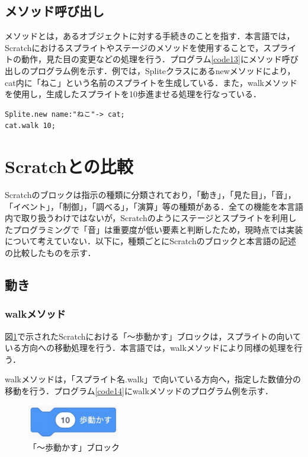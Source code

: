 \documentclass[10pt,a4j]{ltjsarticle}
\begin{document}
\subsection{メソッド呼び出し}
メソッドとは，あるオブジェクトに対する手続きのことを指す．本言語では，Scratchにおけるスプライトやステージのメソッドを使用することで，スプライトの動作，見た目の変更などの処理を行う．プログラム\ref{code13}にメソッド呼び出しのプログラム例を示す．例では，Spliteクラスにあるnewメソッドにより，cat内に「ねこ」という名前のスプライトを生成している．また，walkメソッドを使用し，生成したスプライトを10歩進ませる処理を行なっている．

\begin{lstlisting}[caption=メソッド呼び出しのプログラム例, label=code13]
Splite.new name:"ねこ"-> cat;
cat.walk 10; 
\end{lstlisting}
\clearpage

\section{Scratchとの比較}
Scratchのブロックは指示の種類に分類されており，「動き」，「見た目」，「音」，「イベント」，「制御」，「調べる」，「演算」等の種類がある．全ての機能を本言語内で取り扱うわけではないが，Scratchのようにステージとスプライトを利用したプログラミングで「音」は重要度が低い要素と判断したため，現時点では実装について考えていない．以下に，種類ごとにScratchのブロックと本言語の記述の比較したものを示す．
\subsection{動き}
\subsubsection{walkメソッド}
図\ref{fig:walk}で示されたScratchにおける「〜歩動かす」ブロックは，スプライトの向いている方向への移動処理を行う．本言語では，walkメソッドにより同様の処理を行う．

walkメソッドは，「スプライト名.walk」で向いている方向へ，指定した数値分の移動を行う．プログラム\ref{code14}にwalkメソッドのプログラム例を示す．

\begin{figure}[H]
  \centering
  \includegraphics[height=15mm]{images/walk.pdf}
  \caption{「〜歩動かす」ブロック}
  \label{fig:walk}
\end{figure}
\end{document}

